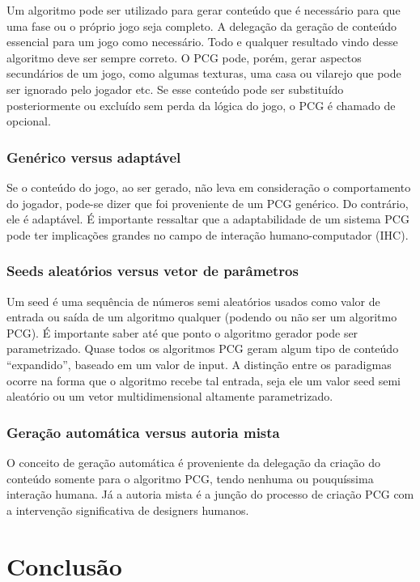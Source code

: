 \documentclass[12pt]{article}
\begin{document}
Um algoritmo pode ser utilizado para gerar conteúdo que é necessário para que uma fase ou o próprio jogo seja completo. A delegação da geração de conteúdo essencial para um jogo como necessário. Todo e qualquer resultado vindo desse algoritmo deve ser sempre correto. O PCG pode, porém, gerar aspectos secundários de um jogo, como algumas texturas, uma casa ou vilarejo que pode ser ignorado pelo jogador etc. Se esse conteúdo pode ser substituído posteriormente ou excluído sem perda da lógica do jogo, o PCG é chamado de opcional.

\subsubsection{Genérico versus adaptável}

Se o conteúdo do jogo, ao ser gerado, não leva em consideração o comportamento do jogador, pode-se dizer que foi proveniente de um PCG genérico. Do contrário, ele é adaptável. É importante ressaltar que a adaptabilidade de um sistema PCG pode ter implicações grandes no campo de interação humano-computador (IHC). 

\subsubsection{Seeds aleatórios versus vetor de parâmetros}

Um seed é uma sequência de números semi aleatórios usados como valor de entrada ou saída de um algoritmo qualquer (podendo ou não ser um algoritmo PCG). É importante saber até que ponto o algoritmo gerador pode ser parametrizado. Quase todos os algoritmos PCG geram algum tipo de conteúdo “expandido”, baseado em um valor de input. A distinção entre os paradigmas ocorre na forma que o algoritmo recebe tal entrada, seja ele um valor seed semi aleatório ou um vetor multidimensional altamente parametrizado.

\subsubsection{Geração automática versus autoria mista}

O conceito de geração automática é proveniente da delegação da criação do conteúdo somente para o algoritmo PCG, tendo nenhuma ou pouquíssima interação humana. Já a autoria mista é a junção do processo de criação PCG com a intervenção significativa de designers humanos. 

\section{Conclusão}
\end{document}
